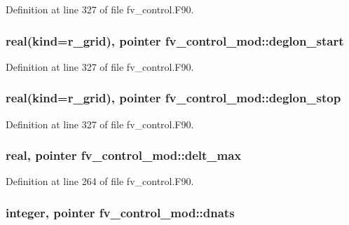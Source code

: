 Definition at line 327 of file fv\-\_\-control.\-F90.

\subsubsection[{deglon\-\_\-start}]{\setlength{\rightskip}{0pt plus 5cm}real(kind=r\-\_\-grid), pointer fv\-\_\-control\-\_\-mod\-::deglon\-\_\-start\hspace{0.3cm}{\ttfamily [private]}}\label{classfv__control__mod_a18d2e658d7550cba86773f1b68e8369c}


Definition at line 327 of file fv\-\_\-control.\-F90.

\subsubsection[{deglon\-\_\-stop}]{\setlength{\rightskip}{0pt plus 5cm}real(kind=r\-\_\-grid), pointer fv\-\_\-control\-\_\-mod\-::deglon\-\_\-stop\hspace{0.3cm}{\ttfamily [private]}}\label{classfv__control__mod_ab666fb8d3f5d8126bd9e756907e613e1}


Definition at line 327 of file fv\-\_\-control.\-F90.

\subsubsection[{delt\-\_\-max}]{\setlength{\rightskip}{0pt plus 5cm}real, pointer fv\-\_\-control\-\_\-mod\-::delt\-\_\-max\hspace{0.3cm}{\ttfamily [private]}}\label{classfv__control__mod_aa87cabccfecdc02ac2bea4465cd1436f}


Definition at line 264 of file fv\-\_\-control.\-F90.

\subsubsection[{dnats}]{\setlength{\rightskip}{0pt plus 5cm}integer, pointer fv\-\_\-control\-\_\-mod\-::dnats\hspace{0.3cm}{\ttfamily [private]}}\label{classfv__control__mod_afecebcac01d762f645993aa69d99826c}



